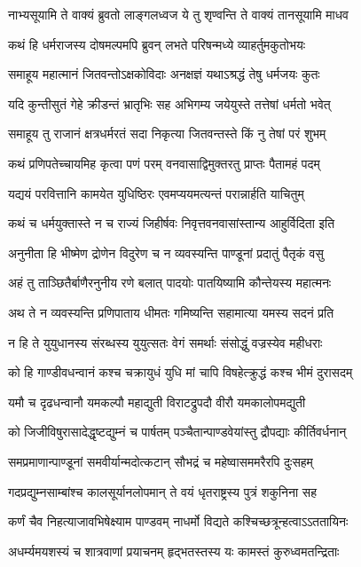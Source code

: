 \twolineshloka
{नाभ्यसूयामि ते वाक्यं ब्रुवतो लाङ्गलध्वज}
{ये तु शृण्वन्ति ते वाक्यं तानसूयामि माधव}


\twolineshloka
{कथं हि धर्मराजस्य दोषमल्पमपि ब्रुवन्}
{लभते परिषन्मध्ये व्याहर्तुमकुतोभयः}


\threelineshloka
{समाहूय महात्मानं जितवन्तोऽक्षकोविदाः}
{अनक्षज्ञं यथाऽश्रद्धं तेषु धर्मजयः कुतः}
{}


\twolineshloka
{यदि कुन्तीसुतं गेहे क्रीडन्तं भ्रातृभिः सह}
{अभिगम्य जयेयुस्ते तत्तेषां धर्मतो भवेत्}


\twolineshloka
{समाहूय तु राजानं क्षत्रधर्मरतं सदा}
{निकृत्या जितवन्तस्ते किं नु तेषां परं शुभम्}


\twolineshloka
{कथं प्रणिपतेच्चायमिह कृत्वा पणं परम्}
{वनवासाद्विमुक्तरतु प्राप्तः पैतामहं पदम्}


\twolineshloka
{यद्ययं परवित्तानि कामयेत युधिष्ठिरः}
{एवमप्ययमत्यन्तं परान्नार्हति याचितुम्}


\twolineshloka
{कथं च धर्मयुक्तास्ते न च राज्यं जिहीर्षवः}
{निवृत्तवनवासांस्तान्य आहुर्विदिता इति}


\twolineshloka
{अनुनीता हि भीष्मेण द्रोणेन विदुरेण च}
{न व्यवस्यन्ति पाण्डूनां प्रदातुं पैतृकं वसु}


\twolineshloka
{अहं तु ताञ्छितैर्बाणैरनुनीय रणे बलात्}
{पादयोः पातयिष्यामि कौन्तेयस्य महात्मनः}


\twolineshloka
{अथ ते न व्यवस्यन्ति प्रणिपाताय धीमतः}
{गमिष्यन्ति सहामात्या यमस्य सदनं प्रति}


\twolineshloka
{न हि ते युयुधानस्य संरब्धस्य युयुत्सतः}
{वेगं समर्थाः संसोद्धुं वज्रस्येव महीधराः}


\twolineshloka
{को हि गाण्डीवधन्वानं कश्च चक्रायुधं युधि}
{मां चापि विषहेत्क्रुद्धं कश्च भीमं दुरासदम्}


\twolineshloka
{यमौ च दृढधन्वानौ यमकल्पौ महाद्युती}
{विराटद्रुपदौ वीरौ यमकालोपमद्युती}


\twolineshloka
{को जिजीविषुरासादेद्धृष्टद्युम्नं च पार्षतम्}
{पञ्चैतान्पाण्डवेयांस्तु द्रौपद्याः कीर्तिवर्धनान्}


\twolineshloka
{समप्रमाणान्पाण्डूनां समवीर्यान्मदोत्कटान्}
{सौभद्रं च महेष्वासममरैरपि दुःसहम्}


\twolineshloka
{गदप्रद्युम्नसाम्बांश्च कालसूर्यानलोपमान्}
{ते वयं धृतराष्ट्रस्य पुत्रं शकुनिना सह}


\twolineshloka
{कर्णं चैव निहत्याजावभिषेक्ष्याम पाण्डवम्}
{नाधर्मो विद्यते कश्चिच्छत्रून्हत्वाऽऽततायिनः}


\twolineshloka
{अधर्म्यमयशस्यं च शात्रवाणां प्रयाचनम्}
{हृद्भतस्तस्य यः कामस्तं कुरुध्वमतन्द्रिताः}


